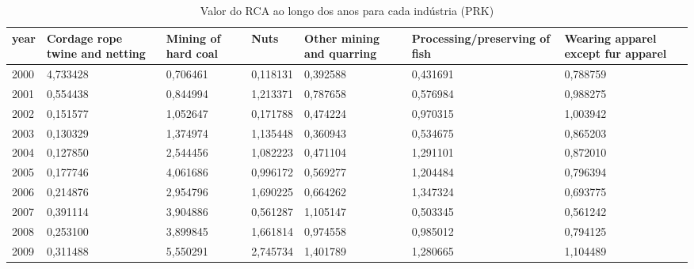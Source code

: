 \begin{table}
\centering
\caption{Valor do RCA ao longo dos anos para cada indústria (PRK)}
\begin{tabular}{p{1cm}p{2cm}p{2cm}p{2cm}p{2cm}p{2cm}p{2cm}}
\toprule
 year &  Cordage rope twine and netting &  Mining of hard coal &      Nuts &  Other mining and quarring &  Processing/preserving of fish &  Wearing apparel except fur apparel \\
\midrule
 2000 &                        4,733428 &             0,706461 &  0,118131 &                   0,392588 &                       0,431691 &                            0,788759 \\
 2001 &                        0,554438 &             0,844994 &  1,213371 &                   0,787658 &                       0,576984 &                            0,988275 \\
 2002 &                        0,151577 &             1,052647 &  0,171788 &                   0,474224 &                       0,970315 &                            1,003942 \\
 2003 &                        0,130329 &             1,374974 &  1,135448 &                   0,360943 &                       0,534675 &                            0,865203 \\
 2004 &                        0,127850 &             2,544456 &  1,082223 &                   0,471104 &                       1,291101 &                            0,872010 \\
 2005 &                        0,177746 &             4,061686 &  0,996172 &                   0,569277 &                       1,204484 &                            0,796394 \\
 2006 &                        0,214876 &             2,954796 &  1,690225 &                   0,664262 &                       1,347324 &                            0,693775 \\
 2007 &                        0,391114 &             3,904886 &  0,561287 &                   1,105147 &                       0,503345 &                            0,561242 \\
 2008 &                        0,253100 &             3,899845 &  1,661814 &                   0,974558 &                       0,985012 &                            0,794125 \\
 2009 &                        0,311488 &             5,550291 &  2,745734 &                   1,401789 &                       1,280665 &                            1,104489 \\

\end{tabular}
\end{table}
